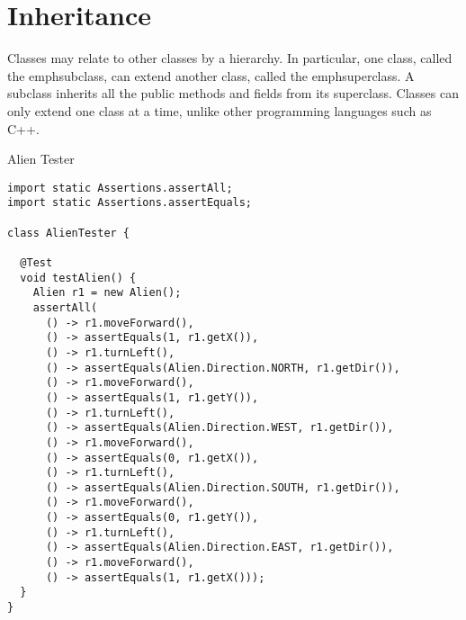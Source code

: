 \section{Inheritance}

Classes may relate to other classes by a hierarchy. In particular, one class, called the emph{subclass}, can extend another class, called the emph{superclass}. A subclass inherits all the public methods and fields from its superclass. Classes can only extend one class at a time, unlike other programming languages such as C++. 


\begin{cl}{Alien Tester}
\begin{lstlisting}[language=MyJava]
import static Assertions.assertAll;
import static Assertions.assertEquals;

class AlienTester {

  @Test
  void testAlien() {
    Alien r1 = new Alien();
    assertAll(
      () -> r1.moveForward(),
      () -> assertEquals(1, r1.getX()),
      () -> r1.turnLeft(),
      () -> assertEquals(Alien.Direction.NORTH, r1.getDir()),
      () -> r1.moveForward(),
      () -> assertEquals(1, r1.getY()),
      () -> r1.turnLeft(),
      () -> assertEquals(Alien.Direction.WEST, r1.getDir()),
      () -> r1.moveForward(),
      () -> assertEquals(0, r1.getX()),
      () -> r1.turnLeft(),
      () -> assertEquals(Alien.Direction.SOUTH, r1.getDir()),
      () -> r1.moveForward(),
      () -> assertEquals(0, r1.getY()),
      () -> r1.turnLeft(),
      () -> assertEquals(Alien.Direction.EAST, r1.getDir()),
      () -> r1.moveForward(),
      () -> assertEquals(1, r1.getX()));
  }
}
\end{lstlisting}
\end{cl}

